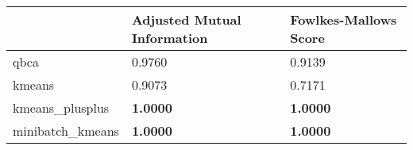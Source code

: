 \begin{table}[htbp]
\centering
\begin{tabular}{lll}
\toprule
 & Adjusted Mutual Information & Fowlkes-Mallows Score \\
\midrule
qbca & 0.9760 & 0.9139 \\
kmeans & 0.9073 & 0.7171 \\
kmeans_plusplus & \textbf{1.0000} & \textbf{1.0000} \\
minibatch_kmeans & \textbf{1.0000} & \textbf{1.0000} \\
\bottomrule
\end{tabular}
\end{table}

